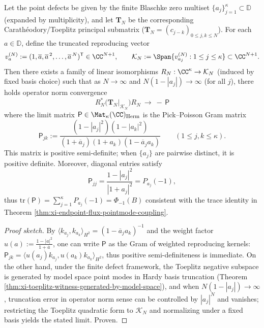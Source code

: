 \begin{proposition}\label{prop:xi-toeplitz-negative-spectrum-pick-poisson-gram}
Let the point defects be given by the finite Blaschke zero multiset \(\{a_j\}_{j=1}^{\kappa}\subset\mathbb{D}\) (expanded by multiplicity), and let \(\mathbf{T}_N\) be the corresponding Carathéodory/Toeplitz principal submatrix (\(\mathbf{T}_N=(c_{j-k})_{0\le j,k\le N}\)).
For each \(a\in\mathbb{D}\), define the truncated reproducing vector
\[
v_a^{(N)}:=(1,\overline a,\overline a^{\,2},\dots,\overline a^{\,N})^{\mathsf T}\in\CC^{N+1},
\qquad
\mathcal{K}_N:=\Span\{v_{a_j}^{(N)}:1\le j\le\kappa\}\subset\CC^{N+1}.
\]
Then there exists a family of linear isomorphisms \(R_N:\CC^\kappa\to\mathcal{K}_N\) (induced by fixed basis choice) such that as \(N\to\infty\) and \(N(1-|a_j|)\to\infty\) (for all \(j\)), there holds operator norm convergence
\[
\boxed{\;
R_N^\ast\bigl(\mathbf{T}_N|_{\mathcal{K}_N}\bigr)R_N\ \longrightarrow\ -\,\mathsf{P}\;}
\]
where the limit matrix \(\mathsf{P}\in\Mat_{\kappa}(\CC)_{\mathrm{Herm}}\) is the Pick--Poisson Gram matrix
\begin{equation}\label{eq:xi-pick-poisson-gram}
\boxed{\;
\mathsf{P}_{jk}
:=
\frac{(1-|a_j|^2)(1-|a_k|^2)}{(1+\overline a_j)(1+a_k)(1-\overline a_j a_k)}
\qquad(1\le j,k\le\kappa).\;}
\end{equation}
This matrix is positive semi-definite; when \(\{a_j\}\) are pairwise distinct, it is positive definite.
Moreover, diagonal entries satisfy
\[
\mathsf{P}_{jj}=\frac{1-|a_j|^2}{|1+a_j|^2}=P_{a_j}(-1),
\]
thus \(\mathrm{tr}(\mathsf{P})=\sum_{j=1}^{\kappa}P_{a_j}(-1)=\Phi_{-1}(B)\) consistent with the trace identity in Theorem \ref{thm:xi-endpoint-flux-pointmode-coupling}.
\end{proposition}
\begin{proof}[Proof sketch]
By \(\langle k_{a_j},k_{a_k}\rangle_{H^2}=(1-\overline a_j a_k)^{-1}\) and the weight factor
\(
u(a):=\frac{1-|a|^2}{1+\overline a}
\),
one can write \(\mathsf P\) as the Gram of weighted reproducing kernels:
\(
\mathsf P_{jk}=\langle u(a_j)k_{a_j},u(a_k)k_{a_k}\rangle_{H^2}
\),
thus positive semi-definiteness is immediate.
On the other hand, under the finite defect framework, the Toeplitz negative subspace is generated by model space point modes in Hardy basis truncation (Theorem \ref{thm:xi-toeplitz-witness-generated-by-model-space}), and when \(N(1-|a_j|)\to\infty\), truncation error in operator norm sense can be controlled by \(|a_j|^{N}\) and vanishes; restricting the Toeplitz quadratic form to \(\mathcal K_N\) and normalizing under a fixed basis yields the stated limit. Proven.
\end{proof}

